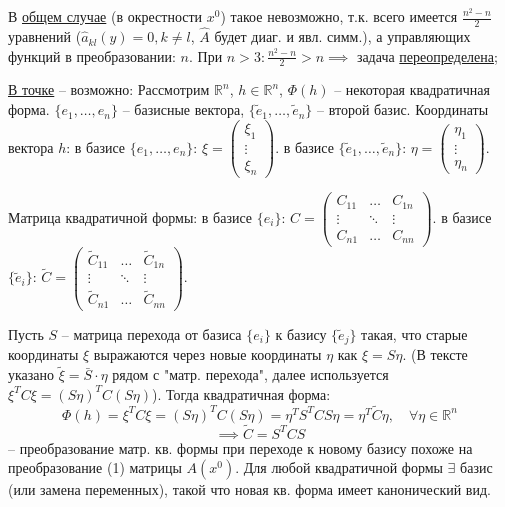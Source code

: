 \documentclass[12pt, a4paper]{article}
\begin{document}
В \underline{общем случае} (в окрестности $x^0$) такое невозможно, т.к. всего имеется $\frac{n^2-n}{2}$ уравнений ($\hat{a}_{kl}(y)=0, k \ne l$, $\hat{A}$ будет диаг. и явл. симм.), а управляющих функций в преобразовании: $n$.
При $n>3: \frac{n^2-n}{2} > n \implies$ задача \underline{переопределена};

\underline{В точке} -- возможно:
Рассмотрим $\mathbb{R}^n$, $h \in \mathbb{R}^n$, $\Phi(h)$ -- некоторая квадратичная форма.
$\{e_1, \dots, e_n\}$ -- базисные вектора, $\{\tilde{e}_1, \dots, \tilde{e}_n\}$ -- второй базис.
Координаты вектора $h$:
в базисе $\{e_1, \dots, e_n\}$: $\xi = \begin{pmatrix} \xi_1 \\ \vdots \\ \xi_n \end{pmatrix}$.
в базисе $\{\tilde{e}_1, \dots, \tilde{e}_n\}$: $\eta = \begin{pmatrix} \eta_1 \\ \vdots \\ \eta_n \end{pmatrix}$.

Матрица квадратичной формы:
в базисе $\{e_i\}$: $C = \begin{pmatrix} C_{11} & \dots & C_{1n} \\ \vdots & \ddots & \vdots \\ C_{n1} & \dots & C_{nn} \end{pmatrix}$.
в базисе $\{\tilde{e}_i\}$: $\tilde{C} = \begin{pmatrix} \tilde{C}_{11} & \dots & \tilde{C}_{1n} \\ \vdots & \ddots & \vdots \\ \tilde{C}_{n1} & \dots & \tilde{C}_{nn} \end{pmatrix}$.

Пусть $S$ -- матрица перехода от базиса $\{e_i\}$ к базису $\{\tilde{e}_j\}$ такая, что старые координаты $\xi$ выражаются через новые координаты $\eta$ как $\xi = S \eta$.
(В тексте указано $\tilde{\xi} = \bar{S} \cdot \eta$ рядом с "матр. перехода", далее используется $\xi^T C \xi = (S\eta)^T C (S\eta)$).
Тогда квадратичная форма:
\[
\Phi(h) = \xi^T C \xi = (S\eta)^T C (S\eta) = \eta^T S^T C S \eta = \eta^T \tilde{C} \eta, \quad \forall \eta \in \mathbb{R}^n
\]
\[
\implies \tilde{C} = S^T C S
\]
-- преобразование матр. кв. формы при переходе к новому базису похоже на преобразование (1) матрицы $A(x^0)$. Для любой квадратичной формы $\exists$ базис (или замена переменных), такой что новая кв. форма имеет канонический вид.
\end{document}
